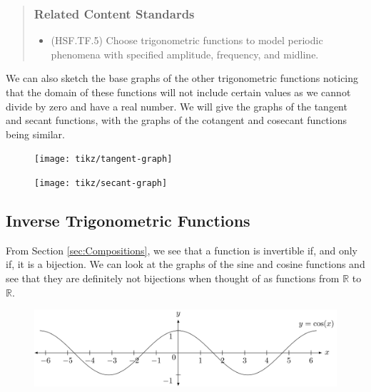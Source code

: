 \documentclass[
]{book}
\providecommand{\tightlist}{%
  \setlength{\itemsep}{0pt}\setlength{\parskip}{0pt}}
\theoremstyle{definition}
\theoremstyle{definition}
\theoremstyle{definition}
\theoremstyle{remark}
\begin{document}
\begin{quote}
\hypertarget{related-content-standards-60}{%
\subsubsection*{Related Content Standards}\label{related-content-standards-60}}

\begin{itemize}
\tightlist
\item
  (HSF.TF.5) Choose trigonometric functions to model periodic phenomena with specified amplitude, frequency, and midline.
\end{itemize}
\end{quote}

We can also sketch the base graphs of the other trigonometric functions noticing that the domain of these functions will not include certain values as we cannot divide by zero and have a real number. We will give the graphs of the tangent and secant functions, with the graphs of the cotangent and cosecant functions being similar.

\begin{figure}

{\centering \texttt{[image: tikz/tangent-graph]} 

}

\end{figure}

\begin{figure}

{\centering \texttt{[image: tikz/secant-graph]} 

}

\end{figure}

\hypertarget{inverse-trigonometric-functions}{%
\subsection{Inverse Trigonometric Functions}\label{inverse-trigonometric-functions}}

From Section \ref{sec:Compositions}, we see that a function is invertible if, and only if, it is a bijection. We can look at the graphs of the sine and cosine functions and see that they are definitely not bijections when thought of as functions from \(\mathbb{R}\) to \(\mathbb{R}\).

\begin{figure}

{\centering \includegraphics[width=1\linewidth]{tikz/cosine-graph} 

}

\end{figure}
\end{document}

